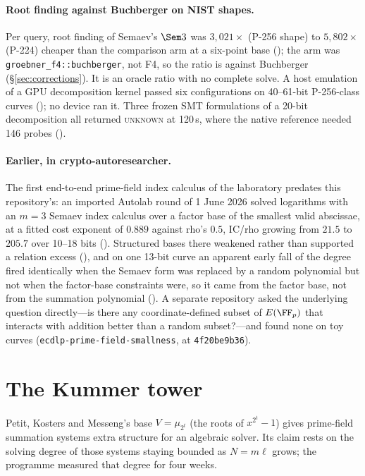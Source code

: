 \paragraph{Root finding against Buchberger on NIST shapes.} Per query, root
finding of Semaev's $\Sem3$ was $3{,}021\times$ (P-256 shape) to
$5{,}802\times$ (P-224) cheaper than the comparison arm at a six-point base
(); the arm was
\texttt{groebner\_f4::buchberger}, not F4, so the ratio is against
Buchberger (\S\ref{sec:corrections}). It is an oracle ratio with no complete
solve. A host emulation of a GPU decomposition kernel passed six
configurations on 40--61-bit P-256-class curves
(); no device ran it.
Three frozen SMT formulations of a 20-bit decomposition all returned
\textsc{unknown} at 120\,s, where the native reference needed 146 probes
().

\paragraph{Earlier, in crypto-autoresearcher.} The first end-to-end
prime-field index calculus of the laboratory predates this repository's:
an imported Autolab round of 1 June 2026 solved logarithms with an $m=3$
Semaev index calculus over a factor base of the smallest valid abscissae, at
a fitted cost exponent of $0.889$ against rho's $0.5$, IC/rho growing from
$21.5$ to $205.7$ over 10--18 bits ().
Structured bases there weakened rather than supported a relation excess
(), and on one 13-bit curve an
apparent early fall of the degree fired identically when the Semaev form
was replaced by a random polynomial but not when the factor-base
constraints were, so it came from the factor base, not from the summation
polynomial (). A separate repository asked the
underlying question directly---is there any coordinate-defined subset of
$E(\FF_p)$ that interacts with addition better than a random subset?---and
found none on toy curves (\texttt{ecdlp-prime-field-smallness},
 at \texttt{4f20be9b36}).

\section{The Kummer tower}\label{sec:pkm}

Petit, Kosters and Messeng's base $V=\mu_{2^t}$ (the roots of
$x^{2^t}-1$) gives prime-field summation systems extra structure for an
algebraic solver. Its claim rests on the solving degree of those systems
staying bounded as $N=m\ell$ grows; the programme measured that degree for
four weeks.

